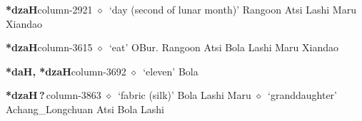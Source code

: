   \item {\footnotesize \textbf{*dzaH}}{\tiny column-2921}
         $\diamond$~`day (second of lunar month)'
         Rangoon 
\hspace{1ex}
         Atsi 
\hspace{1ex}
         Lashi 
\hspace{1ex}
         Maru 
\hspace{1ex}
         Xiandao 
  \item {\footnotesize \textbf{*dzaH}}{\tiny column-3615}
         $\diamond$~`eat'
         OBur. 
\hspace{1ex}
         Rangoon 
\hspace{1ex}
         Atsi 
\hspace{1ex}
         Bola 
\hspace{1ex}
         Lashi 
\hspace{1ex}
         Maru 
\hspace{1ex}
         Xiandao 
  \item {\footnotesize \textbf{*daH, *dzaH}}{\tiny column-3692}
         $\diamond$~`eleven'
         Bola 
  \item {\footnotesize \textbf{*dzaH\,?\,}}{\tiny column-3863}
         $\diamond$~`fabric (silk)'
         Bola 
\hspace{1ex}
         Lashi 
\hspace{1ex}
         Maru 
\hspace{1ex}
         $\diamond$~`granddaughter'
         Achang\_Longchuan 
\hspace{1ex}
         Atsi 
\hspace{1ex}
         Bola 
\hspace{1ex}
         Lashi 
